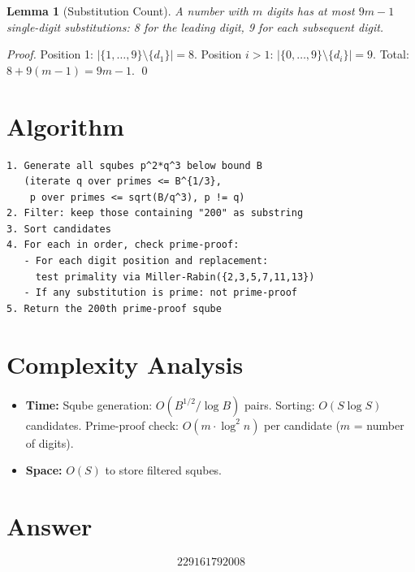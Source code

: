 \documentclass[12pt]{article}
\newtheorem{lemma}[theorem]{Lemma}
\begin{document}
\begin{lemma}[Substitution Count]
A number with $m$ digits has at most $9m - 1$ single-digit substitutions: 8 for the leading digit, 9 for each subsequent digit.
\end{lemma}

\begin{proof}
Position 1: $|\{1,\ldots,9\} \setminus \{d_1\}| = 8$. Position $i > 1$: $|\{0,\ldots,9\} \setminus \{d_i\}| = 9$. Total: $8 + 9(m-1) = 9m - 1$. \qed
\end{proof}

\section{Algorithm}

\begin{verbatim}
1. Generate all squbes p^2*q^3 below bound B
   (iterate q over primes <= B^{1/3},
    p over primes <= sqrt(B/q^3), p != q)
2. Filter: keep those containing "200" as substring
3. Sort candidates
4. For each in order, check prime-proof:
   - For each digit position and replacement:
     test primality via Miller-Rabin({2,3,5,7,11,13})
   - If any substitution is prime: not prime-proof
5. Return the 200th prime-proof sqube
\end{verbatim}

\section{Complexity Analysis}

\begin{itemize}
    \item \textbf{Time:} Sqube generation: $O(B^{1/2}/\log B)$ pairs. Sorting: $O(S \log S)$ candidates. Prime-proof check: $O(m \cdot \log^2 n)$ per candidate ($m$ = number of digits).
    \item \textbf{Space:} $O(S)$ to store filtered squbes.
\end{itemize}

\section{Answer}

\[
\boxed{229161792008}
\]
\end{document}
